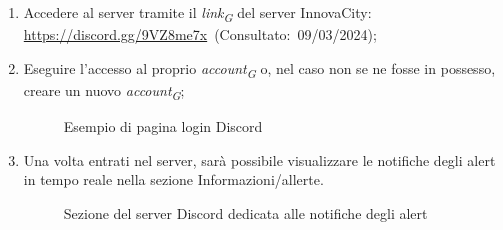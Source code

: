 \begin{enumerate}
    \item Accedere al server tramite il \textit{link}\textsubscript{\textit{G}} del server InnovaCity: \url{https://discord.gg/9VZ8me7x}~(Consultato:~09/03/2024);
    \item Eseguire l'accesso al proprio \textit{account}\textsubscript{\textit{G}} o, nel caso non se ne fosse in possesso, creare un nuovo \textit{account}\textsubscript{\textit{G}};
    \begin{figure}[H]
        \centering
        \caption{Esempio di pagina login Discord}
        \label{fig:my_label}
    \end{figure}
    \item Una volta entrati nel server, sarà possibile visualizzare le notifiche degli alert in tempo reale nella sezione Informazioni/allerte. 
    \begin{figure}[H]
        \centering
        \caption{Sezione del server Discord dedicata alle notifiche degli alert}    
        \label{fig:my_label}
    \end{figure}
\end{enumerate}

